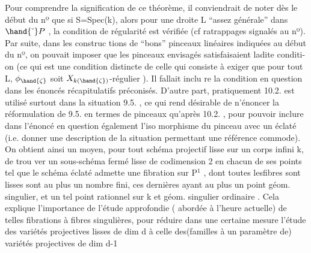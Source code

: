  

Pour comprendre la signification de ce théorème, il conviendrait
de noter dès le début du nº \hand{(}que  si S=Spec(k)\hand{)}, alors pour une droite
L ``assez générale'' dans $\hand{\check{\ }}P$ ,  la condition de régularité est vérifiée 
(cf ratrappages signalés au  nº).  Par suite, dans les construc%
tions de ``bons'' pinceaux linéaires  indiquées au début du nº, on pouvait
imposer que les pinceaux envisagés  satisfaisaient ladite conditi-
on  (ce qui  est une condition distincte de celle qui consiste à
exiger que pour tout \hand{$\zeta\in$}L,  $\phi_{\hand{\zeta}}$  soit $X_{k(\hand{\zeta})}$-régulier ). Il fallait inclu
re la condition en question dans les énoncés récapitulatifs préconisés.
  D'autre part, pratiquement  10.2. est
utilisé surtout dans la situation 9.5. ,  ce qui  rend  désirable de
n'énoncer la réformulation de  9.5.  en termes de pinceaux qu'après
10.2. , pour pouvoir  inclure dans l'énoncé en question  également l'iso
morphisme du pinceau avec un éclaté (i.e. donner une description de la
situation  permettant une référence commode).  On obtient ainsi un
moyen, pour tout schéma projectif lisse sur un corps infini k,  de trou
ver un sous-schéma fermé lisse  de codimension 2 en chacun de
ses points 
 tel que le schéma éclaté admette une fibration
sur P$^1$ , dont toutes les\hand{/}fibres sont lisses sont au plus un nombre fini,
ces dernières ayant au plus un point  géom. singulier, et
un tel point   rationnel sur k et géom. singulier ordinaire .  Cela
explique l'importance  de l'étude approfondie (  abordée à l'heure
actuelle) de telles fibrations à fibres singulières, pour réduire dans 
une certaine mesure l'étude des variétés projectives lisses de dim d
à celle des(familles à un paramètre de) variétés projectives de dim d-1\hand{,}

